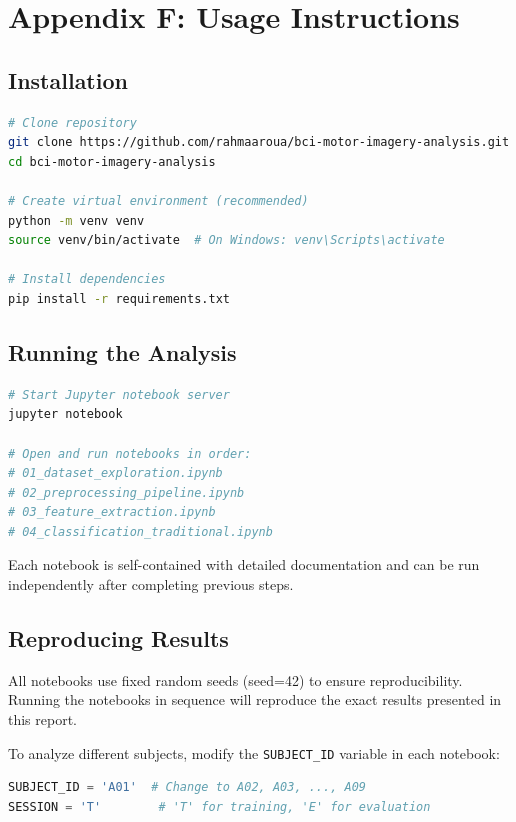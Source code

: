 \documentclass[11pt]{article}
\begin{document}
\section{Appendix F: Usage Instructions}

\subsection{Installation}

\begin{lstlisting}[language=bash]
# Clone repository
git clone https://github.com/rahmaaroua/bci-motor-imagery-analysis.git
cd bci-motor-imagery-analysis

# Create virtual environment (recommended)
python -m venv venv
source venv/bin/activate  # On Windows: venv\Scripts\activate

# Install dependencies
pip install -r requirements.txt
\end{lstlisting}

\subsection{Running the Analysis}

\begin{lstlisting}[language=bash]
# Start Jupyter notebook server
jupyter notebook

# Open and run notebooks in order:
# 01_dataset_exploration.ipynb
# 02_preprocessing_pipeline.ipynb
# 03_feature_extraction.ipynb
# 04_classification_traditional.ipynb
\end{lstlisting}

Each notebook is self-contained with detailed documentation and can be run independently after completing previous steps.

\subsection{Reproducing Results}

All notebooks use fixed random seeds (seed=42) to ensure reproducibility. Running the notebooks in sequence will reproduce the exact results presented in this report.

To analyze different subjects, modify the \texttt{SUBJECT\_ID} variable in each notebook:

\begin{lstlisting}[language=Python]
SUBJECT_ID = 'A01'  # Change to A02, A03, ..., A09
SESSION = 'T'        # 'T' for training, 'E' for evaluation
\end{lstlisting}
\end{document}
